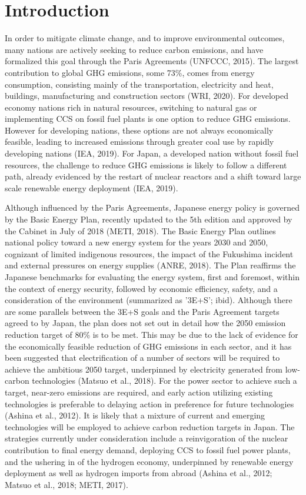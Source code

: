 \section{Introduction} \label{Introduction}
In order to mitigate climate change, and to improve environmental outcomes, many nations are actively seeking to reduce carbon emissions, and have formalized this goal through the Paris Agreements (UNFCCC, 2015). The largest contribution to global \gls{GHG} emissions, some 73\%, comes from energy consumption, consisting mainly of the transportation, electricity and heat, buildings, manufacturing and construction sectors (WRI, 2020). For developed economy nations rich in natural resources, switching to natural gas or implementing \gls{CCS} on fossil fuel plants is one option to reduce GHG emissions. However for developing nations, these options are not always economically feasible, leading to increased emissions through greater coal use by rapidly developing nations (IEA, 2019). For Japan, a developed nation without fossil fuel resources, the challenge to reduce GHG emissions is likely to follow a different path, already evidenced by the restart of nuclear reactors and a shift toward large scale renewable energy deployment (IEA, 2019).

Although influenced by the Paris Agreements, Japanese energy policy is governed by the Basic Energy Plan, recently updated to the 5th edition and approved by the Cabinet in July of 2018 (METI, 2018). The Basic Energy Plan outlines national policy toward a new energy system for the years 2030 and 2050, cognizant of limited indigenous resources, the impact of the Fukushima incident and external pressures on energy supplies (ANRE, 2018). The Plan reaffirms the Japanese benchmarks for evaluating the energy system, first and foremost, within the context of energy security, followed by economic efficiency, safety, and a consideration of the environment (summarized as '3E+S'; ibid). Although there are some parallels between the 3E+S goals and the Paris Agreement targets agreed to by Japan, the plan does not set out in detail how the 2050 emission reduction target of 80\% is to be met. This may be due to the lack of evidence for the economically feasible reduction of GHG emissions in each sector, and it has been suggested that electrification of a number of sectors will be required to achieve the ambitious 2050 target, underpinned by electricity generated from low-carbon technologies (Matsuo et al., 2018). For the power sector to achieve such a target, near-zero emissions are required, and early action utilizing existing technologies is preferable to delaying action in preference for future technologies (Ashina et al., 2012). It is likely that a mixture of current and emerging technologies will be employed to achieve carbon reduction targets in Japan. The strategies currently under consideration include a reinvigoration of the nuclear contribution to final energy demand, deploying \gls{CCS} to fossil fuel power plants, and the ushering in of the hydrogen economy, underpinned by renewable energy deployment as well as hydrogen imports from abroad (Ashina et al., 2012; Matsuo et al., 2018; METI, 2017). 

